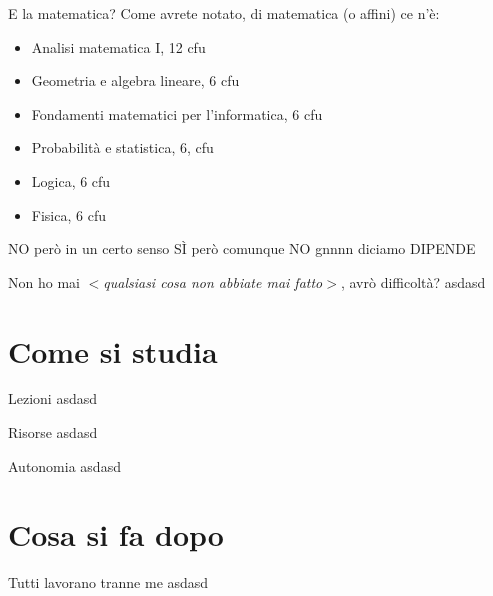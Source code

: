 \documentclass[aspectratio=1610]{beamer}
\begin{document}
	\begin{frame}{E la matematica?}
		Come avrete notato, di matematica (o affini) ce n'è:
			\begin{itemize}
				\item Analisi matematica I, 12 cfu
				\item Geometria e algebra lineare, 6 cfu
				\item Fondamenti matematici per l'informatica, 6 cfu
				\item Probabilità e statistica, 6, cfu
				\item Logica, 6 cfu
				\item Fisica, 6 cfu
			\end{itemize}
			\pause
			\vfill
			\LARGE{NO}
			\pause
			però in un certo senso \LARGE{SÌ}
			\pause
			però comunque \LARGE{NO}
			\pause
			gnnnn diciamo \LARGE{DIPENDE}
	\end{frame}

	\begin{frame}{Non ho mai \textit{$<$qualsiasi cosa non abbiate mai fatto$>$}, avrò difficoltà?}
		asdasd
	\end{frame}

	\section{Come si studia}
	\begin{frame}{Lezioni}
		asdasd
	\end{frame}

	\begin{frame}{Risorse}
		asdasd
	\end{frame}

	\begin{frame}{Autonomia}
		asdasd
	\end{frame}

	\section{Cosa si fa dopo}
	\begin{frame}{Tutti lavorano tranne me}
		asdasd
	\end{frame}
\end{document}
